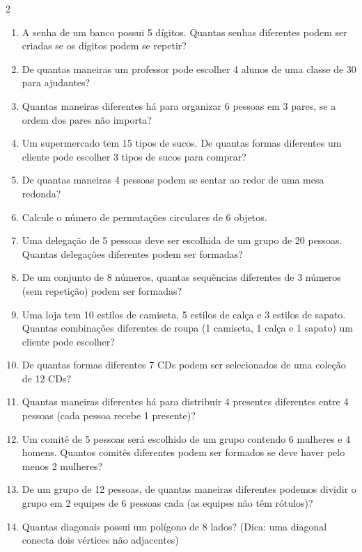 \documentclass[11pt]{article}
\begin{document}
\begin{multicols}{2}
\begin{enumerate}[leftmargin=*]
\item A senha de um banco possui 5 dígitos. Quantas senhas diferentes podem ser criadas se os dígitos podem se repetir?

\item De quantas maneiras um professor pode escolher 4 alunos de uma classe de 30 para ajudantes?

\item Quantas maneiras diferentes há para organizar 6 pessoas em 3 pares, se a ordem dos pares não importa?

\item Um supermercado tem 15 tipos de sucos. De quantas formas diferentes um cliente pode escolher 3 tipos de sucos para comprar?

\item De quantas maneiras 4 pessoas podem se sentar ao redor de uma mesa redonda?

\item Calcule o número de permutações circulares de 6 objetos.

\item Uma delegação de 5 pessoas deve ser escolhida de um grupo de 20 pessoas. Quantas delegações diferentes podem ser formadas?

\item De um conjunto de 8 números, quantas sequências diferentes de 3 números (sem repetição) podem ser formadas?

\item Uma loja tem 10 estilos de camiseta, 5 estilos de calça e 3 estilos de sapato. Quantas combinações diferentes de roupa (1 camiseta, 1 calça e 1 sapato) um cliente pode escolher?

\item De quantas formas diferentes 7 CDs podem ser selecionados de uma coleção de 12 CDs?

\item Quantas maneiras diferentes há para distribuir 4 presentes diferentes entre 4 pessoas (cada pessoa recebe 1 presente)?

\item Um comitê de 5 pessoas será escolhido de um grupo contendo 6 mulheres e 4 homens. Quantos comitês diferentes podem ser formados se deve haver pelo menos 2 mulheres?

\item De um grupo de 12 pessoas, de quantas maneiras diferentes podemos dividir o grupo em 2 equipes de 6 pessoas cada (as equipes não têm rótulos)?

\item Quantas diagonais possui um polígono de 8 lados? (Dica: uma diagonal conecta dois vértices não adjacentes)

\end{enumerate}

\end{multicols}
\end{document}
